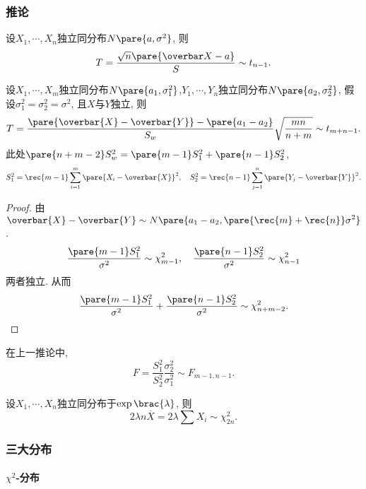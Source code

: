 \documentclass{ctexart}
\begin{document}
\subsubsection{推论} %
\label{ssub:推论}

\begin{corollary}
    设$X_1,\cdots,X_n$独立同分布$N\pare{a,\sigma^2}$, 则
    \[ T = \frac{\sqrt{n}\pare{\overbar X-a}}{S}\sim t_{n-1}. \]
\end{corollary}
\begin{corollary}
    设$X_1,\cdots,X_m$独立同分布$N\pare{a_1,\sigma_1^2}$,$Y_1,\cdots,Y_n$独立同分布$N\pare{a_2,\sigma_2^2}$, 假设$\sigma_1^2 = \sigma_2^2 = \sigma^2$, 且$X$与$Y$独立, 则
    \[ T = \frac{\pare{\overbar{X} - \overbar{Y}} - \pare{a_1 - a_2}}{S_w}\sqrt{\frac{mn}{n+m}}\sim t_{m+n-1}. \]
    此处$\pare{n+m-2}S_w^2 = \pare{m-1}S_1^2 + \pare{n-1}S_2^2$,
    \[ S_1^2 = \rec{m-1}\sum_{i=1}^m \pare{X_i - \overbar{X}}^2,\quad S_2^2 = \rec{n-1}\sum_{j=1}^n \pare{Y_j - \overbar{Y}}^2. \]
\end{corollary}
\begin{proof}
    由$\overbar{X} - \overbar{Y} \sim N\pare{a_1 - a_2, \displaystyle \pare{\rec{m} + \rec{n}}\sigma^2}$.
    \[ \frac{\pare{m-1}S_1^2}{\sigma^2} \sim \chi_{m-1}^2,\quad \frac{\pare{n-1}S_2^2}{\sigma^2}\sim \chi_{n-1}^2 \]
    两者独立. 从而
    \[ \frac{\pare{m-1}S_1^2}{\sigma^2} + \frac{\pare{n-1}S_2^2}{\sigma^2} \sim \chi_{n+m-2}^2. \qedhere \]
\end{proof}
\begin{corollary}
    在上一推论中,
    \[ F = \frac{S_1^2}{S_2^2} \frac{\sigma_2^2}{\sigma_1^2} \sim F_{m-1,n-1}. \]
\end{corollary}
\begin{corollary}
    设$X_1,\cdots,X_n$独立同分布于$\exp\brac{\lambda}$, 则
    \[ 2\lambda n\overbar{X} = 2\lambda \sum X_i \sim \chi_{2n}^2. \]
\end{corollary}


\subsubsection{三大分布} %
\label{ssub:三大分布}

\paragraph{$\chi^2$-分布} %
\label{par:chi_2分布}
\end{document}
